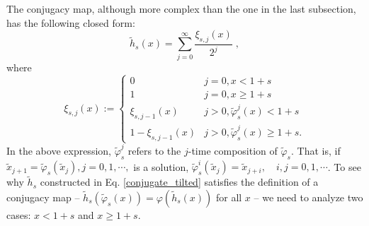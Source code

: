 The conjugacy map, although more complex than the one
in the last subsection, has the following closed form:
\begin{equation} \label{conjugate_tilted}
    \tilde{h}_s(x) = \sum_{j=0}^{\infty} \frac{\xi_{s,j}(x)}{2^j}\;,
\end{equation}
where
\begin{equation} \label{conjugate_tilted_helper}
    \xi_{s,j}(x) := \begin{cases}
    0 & j=0, x<1+s \\
    1 & j=0, x\ge 1+s \\
    \xi_{s,j-1}(x) & j>0, \tilde\varphi_s^j(x) < 1+s \\
    1 - \xi_{s,j-1}(x) & j>0, \tilde\varphi_s^j(x) \ge 1+s.
    \end{cases}
\end{equation}
In the above expression, $\tilde{\varphi}^j_s$ refers to the $j$-time 
composition of $\tilde{\varphi}_s.$ That is, if $\tilde{x}_{j+1} = \tilde{\varphi}_s(\tilde{x}_j), j = 0,1,\cdots,$ is a solution, $\tilde{\varphi}_s^i(\tilde{x}_j) = \tilde{x}_{j+i},\quad i,j = 0,1,\cdots$. 
To see why $\tilde{h}_s$ constructed in Eq. \ref{conjugate_tilted} satisfies the definition of a conjugacy map --
$\tilde{h}_s(\tilde\varphi_s(x)) = \varphi(\tilde{h}_s(x))$ for all $x$ --
we need to analyze two cases: $x<1+s$ and $x\ge 1+s$.
